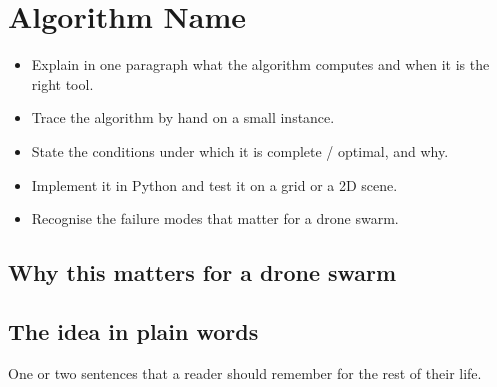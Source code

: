 \chapter{Algorithm Name}
\label{ch:chNN}

\begin{objectives}
\begin{itemize}
  \item Explain in one paragraph what the algorithm computes and when it is the right tool.
  \item Trace the algorithm by hand on a small instance.
  \item State the conditions under which it is complete / optimal, and why.
  \item Implement it in Python and test it on a grid or a 2D scene.
  \item Recognise the failure modes that matter for a drone swarm.
\end{itemize}
\end{objectives}

\section{Why this matters for a drone swarm}
\label{sec:chNN-motivation}

\section{The idea in plain words}
\label{sec:chNN-intuition}
\begin{keyidea}
One or two sentences that a reader should remember for the rest of their life.
\end{keyidea}

